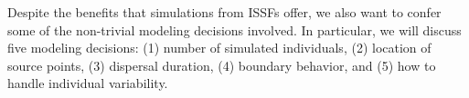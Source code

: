 \documentclass[abstract=on,10pt,a4paper,bibliography=totocnumbered]{article}
\begin{document}

Despite the benefits that simulations from ISSFs offer, we also want to confer
some of the non-trivial modeling decisions involved. In particular, we will
discuss five modeling decisions: (1) number of simulated individuals, (2)
location of source points, (3) dispersal duration, (4) boundary behavior, and
(5) how to handle individual variability.
\end{document}
